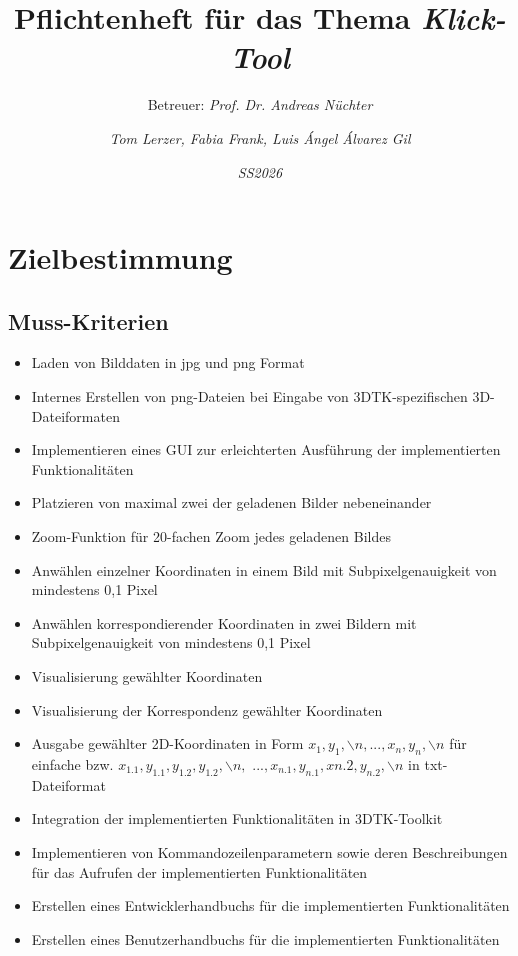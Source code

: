 \documentclass[a4paper,10pt]{scrartcl}
\title{Pflichtenheft für das Thema \glqq\textit{Klick-Tool}\grqq}
\subtitle{Betreuer: \textit{Prof. Dr. Andreas Nüchter}}
\author{\textit{Tom Lerzer, Fabia Frank, Luis Ángel Álvarez Gil}}
\date{\textit{SS2026}}
\begin{document}
\maketitle



\section{Zielbestimmung}

\subsection{Muss-Kriterien}

\begin{itemize}
    \item Laden von Bilddaten in jpg und png Format
    \item Internes Erstellen von png-Dateien bei Eingabe von 3DTK-spezifischen 3D-Dateiformaten
    \item Implementieren eines GUI zur erleichterten Ausführung der implementierten Funktionalitäten
    \item Platzieren von maximal zwei der geladenen Bilder nebeneinander
    \item Zoom-Funktion für 20-fachen Zoom jedes geladenen Bildes
    \item Anwählen einzelner Koordinaten in einem Bild mit Subpixelgenauigkeit von mindestens 0,1 Pixel
    \item Anwählen korrespondierender Koordinaten in zwei Bildern mit Subpixelgenauigkeit von mindestens 0,1 Pixel
    \item Visualisierung gewählter Koordinaten
    \item Visualisierung der Korrespondenz gewählter Koordinaten
    \item Ausgabe gewählter 2D-Koordinaten in Form $x_1, y_1, \backslash n, ..., x_n, y_n, \backslash n$ für einfache bzw. $x_{1.1}, y_{1.1}, y_{1.2}, y_{1.2}, \backslash n ,$ $ ..., x_{n.1}, y_{n.1}, x{n.2}, y_{n.2},  \backslash n$ in txt-Dateiformat
    \item Integration der implementierten Funktionalitäten in 3DTK-Toolkit 
    \item Implementieren von Kommandozeilenparametern sowie deren Beschreibungen für das Aufrufen der implementierten Funktionalitäten
    \item Erstellen eines Entwicklerhandbuchs für die implementierten Funktionalitäten
    \item Erstellen eines Benutzerhandbuchs für die implementierten Funktionalitäten
\end{itemize}
\end{document}
